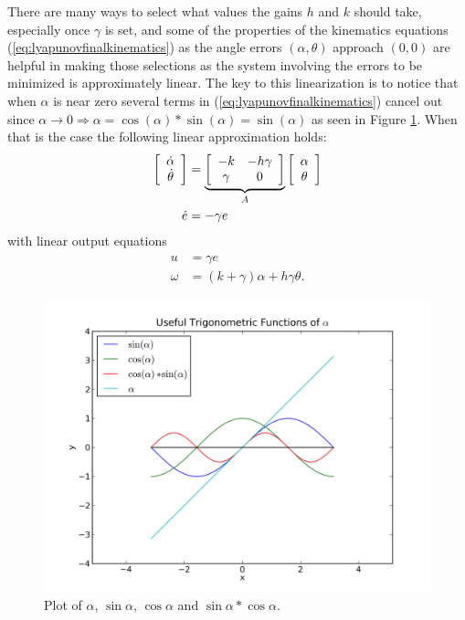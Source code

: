 There are many ways to select what values the gains $h$ and $k$ should take, especially once $\gamma$ is set, and some of the properties of the kinematics equations (\ref{eq:lyapunovfinalkinematics}) as the angle errors $(\alpha, \theta)$ approach $(0, 0)$ are helpful in making those selections as the system involving the errors to be minimized is approximately linear. The key to this linearization is to notice that when $\alpha$ is near zero several terms in (\ref{eq:lyapunovfinalkinematics}) cancel out since $\alpha\to0\Rightarrow \alpha=\cos(\alpha)*\sin(\alpha)=\sin(\alpha)$ as seen in Figure \ref{fig:plotSinCos}. When that is the case the following linear approximation holds:
\begin{align}
\label{eq:lyapunovLinearSystem}
\begin{split}
\left[\begin{array}{c} \dot{\alpha} \\ \dot{\theta} \end{array}\right]
&= \underbrace{\left[\begin{array}{c c} -k & -h\gamma \\ \gamma & 0 \end{array}\right]}_{A}
\left[\begin{array}{c} \alpha \\ \theta \end{array}\right] \\
\dot{e} &= -\gamma e
\end{split}
\end{align}
with linear output equations
\begin{align}
\label{eq:lyapunovLinearOutput}
\begin{split}
u &= \gamma e \\
\omega &= (k+\gamma)\alpha + h\gamma\theta.
\end{split}
\end{align}

\begin{figure}[ht!]
	\centering
	\includegraphics[width=.75\textwidth]{images/plotSinCos}
	\caption{Plot of $\alpha$, $\sin\alpha$, $\cos\alpha$ and $\sin\alpha*\cos\alpha$.}
	\label{fig:plotSinCos}
\end{figure}

